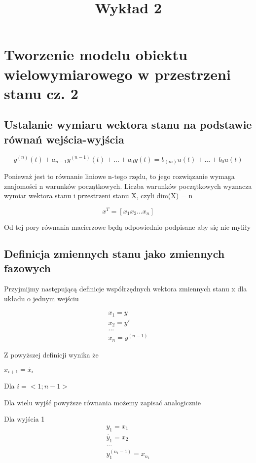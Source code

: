 \documentclass{article}
\title{Wykład 2}
\begin{document}
	\maketitle
	\section{Tworzenie modelu obiektu wielowymiarowego w przestrzeni stanu cz. 2}
	\subsection{Ustalanie wymiaru wektora stanu na podstawie równań wejścia-wyjścia}

		\begin{equation}
			y^{(n)}(t) + a_{n-1} y^{(n-1)}(t) + ... +   a_{0} y(t) = b_{(m)} u(t) + ... + b_{0} u(t)
		\end{equation}

		Ponieważ jest to równanie liniowe n-tego rzędu, to jego rozwiązanie wymaga znajomości
		n warunków początkowych. Liczba warunków początkowych wyznacza wymiar wektora stanu
		i przestrzeni stanu X, czyli dim(X) = n

		\begin{equation}
			x^{T} = [ x_{1} x_{2} ... x_{n} ]
		\end{equation}

		Od tej pory równania macierzowe będą odpowiednio podpisane aby się nie myliły

	\subsection{Definicja zmiennych stanu jako zmiennych fazowych}

		Przyjmijmy następującą definicje współrzędnych wektora zmiennych stanu x
		dla układu o jednym wejściu
		
		
			\begin{align*}
				 x_{1} = y \\
				 x_{2} = y' \\
				... \\
				 x_{n} = y^{(n-1)} 
			\end{align*}

		Z powyższej definicji wynika że

		$ x_{i+1} = \dot{x_{i}} $

		Dla $i = <1;n-1> $

		Dla wielu wyjść powyższe równania możemy zapisać analogicznie

		Dla wyjścia 1
			\begin{align*}
				 y_{1} = x_{1} \\
				 \dot{y_{1}} = x_{2} \\
				... \\
				 y_{1}^{(n_{1}-1)} = x_{n_{1}}
			\end{align*}
\end{document}
